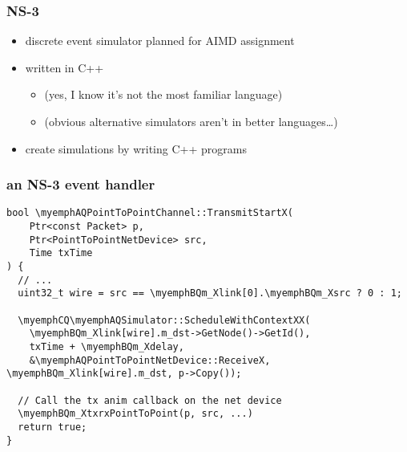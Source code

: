 \begin{frame}\frametitle{NS-3}
    \begin{itemize}
    \item discrete event simulator planned for AIMD assignment
    \item written in C++
        \begin{itemize}
        \item (yes, I know it's not the most familiar language)
        \item (obvious alternative simulators aren't in better languages\ldots)
        \end{itemize}
    \item create simulations by writing C++ programs
    \end{itemize}
\end{frame}

\begin{FragileFrame}
\frametitle{an NS-3 event handler}
\providecommand{\myemphA}[1]{\myemph<2>{#1}}
\providecommand{\myemphB}[1]{\myemph<3>{#1}}
\providecommand{\myemphC}[1]{\myemph<4>{#1}}
\begin{Verbatim}[fontsize=\fontsize{9}{10},commandchars=\\QX]
bool \myemphAQPointToPointChannel::TransmitStartX(
    Ptr<const Packet> p,
    Ptr<PointToPointNetDevice> src,
    Time txTime
) {
  // ...
  uint32_t wire = src == \myemphBQm_Xlink[0].\myemphBQm_Xsrc ? 0 : 1;

  \myemphCQ\myemphAQSimulator::ScheduleWithContextXX(
    \myemphBQm_Xlink[wire].m_dst->GetNode()->GetId(),
    txTime + \myemphBQm_Xdelay,
    &\myemphAQPointToPointNetDevice::ReceiveX, \myemphBQm_Xlink[wire].m_dst, p->Copy());

  // Call the tx anim callback on the net device
  \myemphBQm_XtxrxPointToPoint(p, src, ...)
  return true;
}
\end{Verbatim}
\end{FragileFrame}

